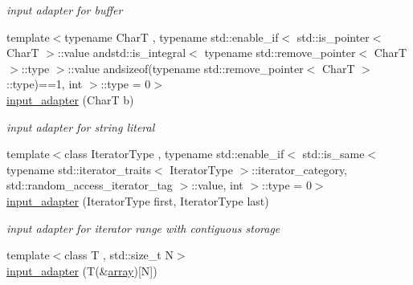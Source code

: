 \begin{DoxyCompactItemize}
\begin{DoxyCompactList}\small\item\em input adapter for buffer \end{DoxyCompactList}\item 
{\footnotesize template$<$typename CharT , typename std\+::enable\+\_\+if$<$ std\+::is\+\_\+pointer$<$ Char\+T $>$\+::value andstd\+::is\+\_\+integral$<$ typename std\+::remove\+\_\+pointer$<$ Char\+T $>$\+::type $>$\+::value andsizeof(typename std\+::remove\+\_\+pointer$<$ Char\+T $>$\+::type)==1, int $>$\+::type  = 0$>$ }\\\hyperlink{classnlohmann_1_1detail_1_1input__adapter_a86f035d9c4319360014b922b5e433ced}{input\+\_\+adapter} (CharT b)\hypertarget{classnlohmann_1_1detail_1_1input__adapter_a86f035d9c4319360014b922b5e433ced}{}\label{classnlohmann_1_1detail_1_1input__adapter_a86f035d9c4319360014b922b5e433ced}

\begin{DoxyCompactList}\small\item\em input adapter for string literal \end{DoxyCompactList}\item 
{\footnotesize template$<$class Iterator\+Type , typename std\+::enable\+\_\+if$<$ std\+::is\+\_\+same$<$ typename std\+::iterator\+\_\+traits$<$ Iterator\+Type $>$\+::iterator\+\_\+category, std\+::random\+\_\+access\+\_\+iterator\+\_\+tag $>$\+::value, int $>$\+::type  = 0$>$ }\\\hyperlink{classnlohmann_1_1detail_1_1input__adapter_ad6824b0f792691f75186c527fa31a6b4}{input\+\_\+adapter} (Iterator\+Type first, Iterator\+Type last)\hypertarget{classnlohmann_1_1detail_1_1input__adapter_ad6824b0f792691f75186c527fa31a6b4}{}\label{classnlohmann_1_1detail_1_1input__adapter_ad6824b0f792691f75186c527fa31a6b4}

\begin{DoxyCompactList}\small\item\em input adapter for iterator range with contiguous storage \end{DoxyCompactList}\item 
{\footnotesize template$<$class T , std\+::size\+\_\+t N$>$ }\\\hyperlink{classnlohmann_1_1detail_1_1input__adapter_aa2392138bf8307df1994dc7eb22d51ce}{input\+\_\+adapter} (T(\&\hyperlink{namespacenlohmann_1_1detail_a90aa5ef615aa8305e9ea20d8a947980faf1f713c9e000f5d3f280adbd124df4f5}{array})\mbox{[}N\mbox{]})\hypertarget{classnlohmann_1_1detail_1_1input__adapter_aa2392138bf8307df1994dc7eb22d51ce}{}\label{classnlohmann_1_1detail_1_1input__adapter_aa2392138bf8307df1994dc7eb22d51ce}


\end{DoxyCompactItemize}
